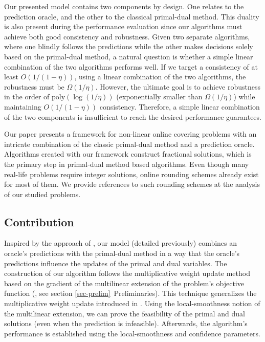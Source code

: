 Our presented model contains two components by design. One relates to the prediction oracle, and the other to the classical primal-dual method. This duality is also present during the performance evaluation since our algorithms must achieve both good consistency and robustness. Given two separate algorithms, where one blindly follows the predictions while the other makes decisions solely based on the primal-dual method, a natural question is whether a simple linear combination of the two algorithms performs well. If we target a consistency of at least $O(1/(1-\eta))$, using a linear combination of the two algorithms, the robustness must be $\Omega(1/\eta)$. However, the ultimate goal is to achieve robustness in the order of $\text{poly}(\log(1/\eta))$ (exponentially smaller than $\Omega(1/\eta)$) while maintaining $O(1/(1-\eta))$ consistency. Therefore, a simple linear combination of the two components is insufficient to reach the desired performance guarantees.

Our paper presents a framework for non-linear online covering problems with an intricate combination of the classic primal-dual method and a prediction oracle. Algorithms created with our framework construct fractional solutions, which is the primary step in primal-dual method based algorithms. Even though many real-life problems require integer solutions, online rounding schemes already exist for most of them.   We provide references to such rounding schemes at the analysis of our studied problems.


\subsection{Contribution}  \label{sec:intro-covering}

Inspired by the approach of \cite{BamasMaggiori20:The-Primal-Dual-method}, our model (detailed previously) combines an oracle's predictions with the primal-dual method in a way that the oracle's predictions influence the updates of the primal and dual variables. The construction of our algorithm follows the multiplicative weight update method based on the gradient of the multilinear extension of the problem's objective function (\cite{Thang20:Online-Primal-Dual}, see section \ref{sec-prelim}~Preliminaries). This technique generalizes the multiplicative weight update introduced in \cite{BuchbinderNaor09:The-Design-of-Competitive,AzarBuchbinder16:Online-Algorithms}. Using the local-smoothness notion of the multilinear extension, we can prove the feasibility of the primal and dual solutions (even when the prediction is infeasible). Afterwards, the algorithm's performance is established using the local-smoothness and confidence parameters.


